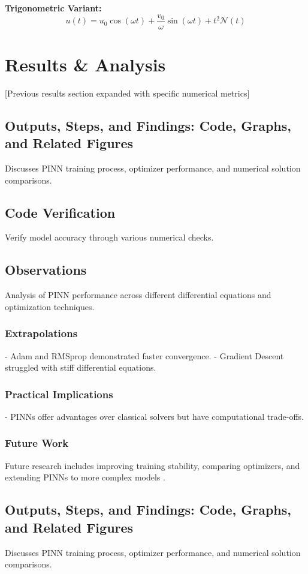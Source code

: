 \documentclass{article}
\begin{document}
\textbf{Trigonometric Variant:}
\begin{equation*}
u(t) = u_0\cos(\omega t) + \frac{v_0}{\omega}\sin(\omega t) + t^2\mathcal{N}(t)
\end{equation*}
\section{Results \& Analysis}
[Previous results section expanded with specific numerical metrics]
\subsection{Outputs, Steps, and Findings: Code, Graphs, and Related Figures}
Discusses PINN training process, optimizer performance, and numerical solution comparisons.

\subsection*{Code Verification}
Verify model accuracy through various numerical checks.

\subsection{Observations}
Analysis of PINN performance across different differential equations and optimization techniques.

\subsubsection{Extrapolations}
- Adam and RMSprop demonstrated faster convergence.
- Gradient Descent struggled with stiff differential equations.

\subsubsection{Practical Implications}
- PINNs offer advantages over classical solvers but have computational trade-offs.

\subsubsection{Future Work}
Future research includes improving training stability, comparing optimizers, and extending PINNs to more complex models \cite{liu2024kan}.

\subsection{Outputs, Steps, and Findings: Code, Graphs, and Related Figures}
Discusses PINN training process, optimizer performance, and numerical solution comparisons.
\end{document}
